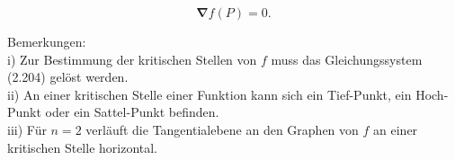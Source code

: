 \documentclass[10pt]{article}
\begin{document}
\begin{equation*}
\boldsymbol{\nabla} f(P)=0 . \tag{2.204}
\end{equation*}


Bemerkungen:\\
i) Zur Bestimmung der kritischen Stellen von $f$ muss das Gleichungssystem (2.204) gelöst werden.\\
ii) An einer kritischen Stelle einer Funktion kann sich ein Tief-Punkt, ein Hoch-Punkt oder ein Sattel-Punkt befinden.\\
iii) Für $n=2$ verläuft die Tangentialebene an den Graphen von $f$ an einer kritischen Stelle horizontal.
\end{document}
